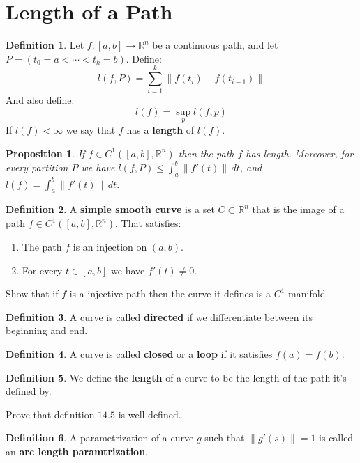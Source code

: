 \documentclass[11pt,a4paper]{article}
\theoremstyle{definition}
\newtheorem{definition}{Definition}[section]
\theoremstyle{plain}
\newtheorem{proposition}[theorem]{Proposition}
\newcommand{\R}{\mathbb{R}}
\begin{document}
	\newpage
	
	\section{Length of a Path}
	\begin{definition}
		Let $f \colon [a,b] \to \R^n$ be a continuous path, and let
		$P = (t_0 = a < \cdots < t_k = b)$. Define:
		\[
			l(f,P) = \sum_{i=1}^{k}{\|f(t_i) - f(t_{i-1})\|}
		\]
		And also define:
		\[
			l(f) = \sup_{p}{l(f,p)}
		\]
		If $l(f) < \infty$ we say that $f$ has a \textbf{length} of
		$l(f)$.
	\end{definition}
	\begin{proposition}
		If $f \in C^1([a,b], \R^n)$ then the path $f$ has length.
		Moreover, for every partition $P$ we have 
		$l(f,P) \le \int_{a}^{b}{\|f'(t)\|\,dt}$, and 
		$l(f) = \int_{a}^{b}{\|f'(t)\|\,dt}$.
	\end{proposition}
	\begin{definition}
		A \textbf{simple smooth curve} is a set $C \subset \R^n$ that
		is the image of a path $f \in C^1([a,b],\R^n)$. That satisfies:
		\begin{enumerate}
			\item The path $f$ is an injection on $(a,b)$.
			\item For every $t \in [a,b]$ we have $f'(t) \neq 0$.
		\end{enumerate}
	\end{definition}
	Show that if $f$ is a injective path then the curve it defines is
	a $C^1$ manifold.
	\begin{definition}
		A curve is called \textbf{directed} if we differentiate between
		its beginning and end.
	\end{definition}
	\begin{definition}
		A curve is called \textbf{closed} or a \textbf{loop} if it
		satisfies $f(a) = f(b)$.
	\end{definition}
	\begin{definition}
		We define the \textbf{length} of a curve to be the length
		of the path it's defined by.
	\end{definition}
	Prove that definition $14.5$ is well defined.
	\begin{definition}
		A parametrization of a curve $g$ such that $\|g'(s)\| = 1$
		is called an \textbf{arc length paramtrization}.
	\end{definition}
	
\end{document}
